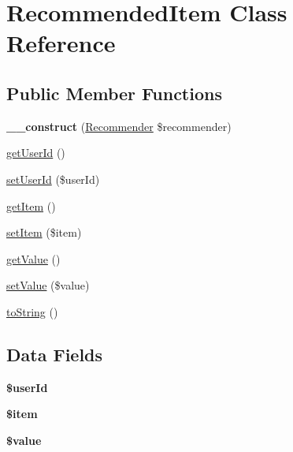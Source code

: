 \hypertarget{class_recommended_item}{\section{Recommended\+Item Class Reference}
\label{class_recommended_item}
}
\subsection*{Public Member Functions}
\begin{DoxyCompactItemize}
\item 
\hypertarget{class_recommended_item_a95ae85e1a5ade37deb870a408264b3a5}{{\bfseries \+\_\+\+\_\+construct} (\hyperlink{class_recommender}{Recommender} \$recommender)}\label{class_recommended_item_a95ae85e1a5ade37deb870a408264b3a5}

\item 
\hyperlink{class_recommended_item_a05f6aa1ffae6295260d9f1cca016bf33}{get\+User\+Id} ()
\item 
\hyperlink{class_recommended_item_aad3264e2196ea03403e62460cd62ff96}{set\+User\+Id} (\$user\+Id)
\item 
\hyperlink{class_recommended_item_a094b2839a8ef421bca847866dc22ab33}{get\+Item} ()
\item 
\hyperlink{class_recommended_item_adab498b079079d90520787d3c85f8737}{set\+Item} (\$item)
\item 
\hyperlink{class_recommended_item_ac0bc18784b182c89fcfd276625aef435}{get\+Value} ()
\item 
\hyperlink{class_recommended_item_a7494441b6ed08a391704971873f31432}{set\+Value} (\$value)
\item 
\hyperlink{class_recommended_item_a5558c5d549f41597377fa1ea8a1cefa3}{to\+String} ()
\end{DoxyCompactItemize}
\subsection*{Data Fields}
\begin{DoxyCompactItemize}
\item 
\hypertarget{class_recommended_item_a84651f4070d04080f6c5fd3c98cc9104}{{\bfseries \$user\+Id}}\label{class_recommended_item_a84651f4070d04080f6c5fd3c98cc9104}

\item 
\hypertarget{class_recommended_item_aa61b415cee119a7511e05c405ecd0b32}{{\bfseries \$item}}\label{class_recommended_item_aa61b415cee119a7511e05c405ecd0b32}

\item 
\hypertarget{class_recommended_item_a0f298096f322952a72a50f98a74c7b60}{{\bfseries \$value}}\label{class_recommended_item_a0f298096f322952a72a50f98a74c7b60}

\end{DoxyCompactItemize}



